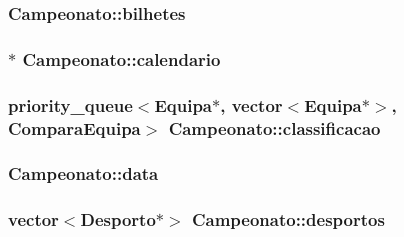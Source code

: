\subsubsection[{bilhetes}]{ Campeonato\+::bilhetes\hspace{0.3cm}{\ttfamily [private]}}\label{class_campeonato_a249c44f11d932f372f9f78959e1ff5b6}
\hypertarget{class_campeonato_af4bf75bd6daa812d16ab2be60c356f21}{}
\subsubsection[{calendario}]{$\ast$ Campeonato\+::calendario\hspace{0.3cm}{\ttfamily [private]}}\label{class_campeonato_af4bf75bd6daa812d16ab2be60c356f21}
\hypertarget{class_campeonato_a18205708f31afeb6c1b172aecfb10cac}{}
\subsubsection[{classificacao}]{\setlength{\rightskip}{0pt plus 5cm}priority\+\_\+queue$<${\bf Equipa}$\ast$, vector$<${\bf Equipa}$\ast$$>$, {\bf Compara\+Equipa}$>$ Campeonato\+::classificacao\hspace{0.3cm}{\ttfamily [private]}}\label{class_campeonato_a18205708f31afeb6c1b172aecfb10cac}
\hypertarget{class_campeonato_ab9a3d4a07de27528556e0ffebda3ba97}{}
\subsubsection[{data}]{ Campeonato\+::data\hspace{0.3cm}{\ttfamily [private]}}\label{class_campeonato_ab9a3d4a07de27528556e0ffebda3ba97}
\hypertarget{class_campeonato_ab65bbad67e796b73176b696457ea39ea}{}
\subsubsection[{desportos}]{\setlength{\rightskip}{0pt plus 5cm}vector$<${\bf Desporto}$\ast$$>$ Campeonato\+::desportos\hspace{0.3cm}{\ttfamily [private]}}\label{class_campeonato_ab65bbad67e796b73176b696457ea39ea}
\hypertarget{class_campeonato_ab677d5217856ce0ff2887a0e335caf2d}{}
